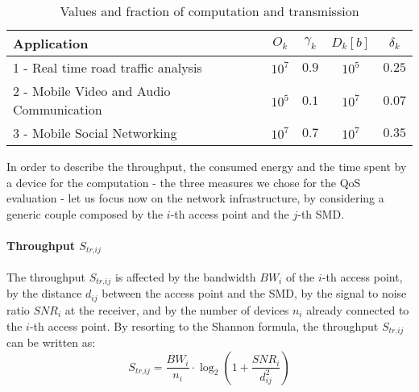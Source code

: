 \documentclass[twoside,openright]{report}
\begin{document}
\begin{table}[tbp]
\begin{center}
\caption{Values and fraction of computation and transmission}
\label{tab:applications_par1}
{
\renewcommand{\arraystretch}{2}
\begin{tabular}{p{8cm}|c|c|c|c}\hline\hline 
Application 							& $O_k$ 			& $\gamma_k$ 		& $D_k [b]$ 			& $\delta_k$		\\  \hline
1 - Real time road traffic analysis 			& $10^7$ 			& $0.9$			& $10^5$			& $0.25$		\\ 
2 - Mobile Video and Audio Communication 		& $10^5$ 			& $0.1$			& $10^7$ 			& $0.07$		\\ 
3 - Mobile Social Networking				& $10^7$ 			& $0.7$			& $10^7$  		& $0.35$		\\  \hline
\end{tabular}
}
\end{center}
\end{table}

In order to describe the throughput, the consumed energy and the time spent by a device for the computation - the three measures we chose for the \gls{QoS} evaluation - let us focus now on the network infrastructure, by considering a generic couple composed by the $i$-th access point and the $j$-th \gls{SMD}.

\paragraph{Throughput ${S_{\textit{tr},\textit{ij}}}$ } The throughput ${S_{\textit{tr},\textit{ij}}}$ is affected by the bandwidth ${\textit{BW}}_{i}$ of the $i$-th access point, by the distance ${d_{\textit{ij}}}$ between the access point and the \gls{SMD}, by the signal to noise ratio  $\textit{SNR}_i$ at the receiver, and by the number of devices $n_i$ already connected to the $i$-th access point. By resorting to the Shannon formula, the throughput ${S_{\textit{tr},\textit{ij}}}$ can be written as:	  
\begin{equation}
\label{eq:Str2}
S_{\textit{tr},\textit{ij}} = \frac{{\textit{BW}}_{i}}{n_i}\cdot \log_2 {\left(1+  \frac{\textit{SNR}_{i}}{d_{\textit{ij}}^2}\right)}                \end{equation} 
\end{document}
